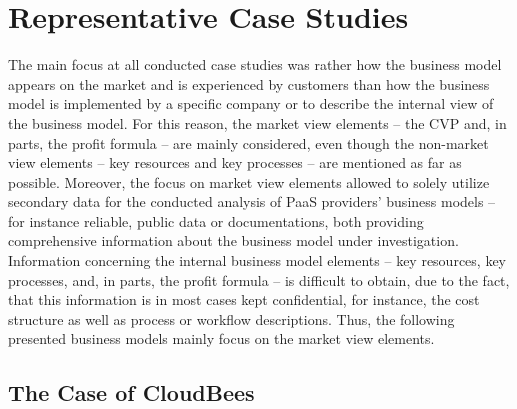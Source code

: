 
\section{Representative Case Studies}

The main focus at all conducted case studies was rather how the business model appears on the market and is experienced by customers than how the business model is implemented by a specific company or to describe the internal view of the business model. For this reason, the market view elements -- the \ac{CVP} and, in parts, the profit formula -- are mainly considered, even though the non-market view elements -- key resources and key processes -- are mentioned as far as possible. Moreover, the focus on market view elements allowed to solely utilize secondary data for the conducted analysis of \ac{PaaS} providers' business models -- for instance reliable, public data or documentations, both providing comprehensive information about the business model under investigation. Information concerning the internal business model elements -- key resources, key processes, and, in parts, the profit formula -- is difficult to obtain, due to the fact, that this information is in most cases kept confidential, for instance, the cost structure as well as process or workflow descriptions. Thus, the following presented business models mainly focus on the market view elements.

\subsection{The Case of CloudBees}\label{ch:sota:cb}

